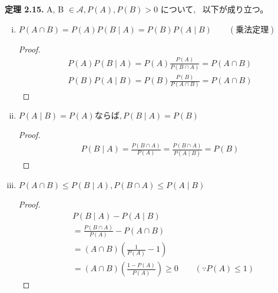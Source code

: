 \documentclass[dvipdfmx,10pt, a4j]{jarticle}
\theoremstyle{definition}
\begin{document}
    \noindent
    \textbf{定理 2.15.} A, B $\in \mathcal{A}, P(A), P(B) > 0$ について, \, 以下が成り立つ。\\
    \begin{enumerate}[i)]
        \item $P(A \cap B) = P(A)P(B \mid A) = P(B)P(A \mid B) \qquad (乗法定理)$\\
        \begin{proof}
            \begin{align*}
                P(A)P(B \mid A) = P(A)\frac{P(A)}{P(B \cap A)} = P(A \cap B)\\
                P(B)P(A \mid B) = P(B)\frac{P(B)}{P(A \cap B)} = P(A \cap B)
            \end{align*}
        \end{proof}
        \item $P(A \mid B) = P(A) ならば, P(B \mid A) = P(B)$
        \begin{proof}
            \begin{align*}
                P(B \mid A) = \frac{P(B \cap A)}{P(A)} = \frac{P(B \cap A)}{P(A \mid B)} = P(B)
            \end{align*}
        \end{proof}
        \item $P(A \cap B) \leq P(B \mid A), P(B \cap A) \leq P(A \mid B)$
        \begin{proof}
            \begin{align*}
                &P(B \mid A) - P(A \mid B)\\
                &= \frac{P(B \cap A)}{P(A)} - P(A \cap B)\\
                &= (A \cap B)(\frac{1}{P(A)} - 1)\\
                &= (A \cap B)(\frac{1 - P(A)}{P(A)}) \geq 0 \qquad (\because{P(A) \leq 1})
            \end{align*}
        \end{proof}
    \end{enumerate}
\end{document}
